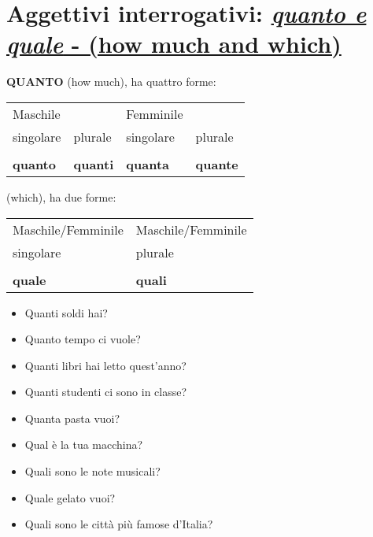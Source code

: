 \documentclass[letter,11pt]{article}
\begin{document}
\vskip 0.5in

\section*{Aggettivi interrogativi:
\underline{\emph{quanto e quale} - (how much and which)}}
\vskip 0.2in

{\bf QUANTO} (how much), ha quattro forme:
\vskip 0.2in

\noindent \begin{tabular}{ |p{3cm}| p{3cm}| p{3cm}| p{3cm}|}
    Maschile  &  &   Femminile &  \\
    singolare & plurale &   singolare & plurale  \\
    \hline
    \hline
     &  &    &  \\ \hline
    {\bf quanto }  & {\bf quanti} &    {\bf quanta} & {\bf quante}   \\ \hline
    \hline
\end{tabular}

\vskip 0.2in

 (which), ha due forme:
\vskip 0.2in

\noindent \begin{tabular}{ |p{5cm}| p{5cm}| }
    Maschile/Femminile  &  Maschile/Femminile   \\
    singolare & plurale   \\
    \hline
    \hline
     &    \\ \hline
    {\bf quale}  & {\bf quali}   \\ \hline
    \hline
\end{tabular}

\vskip 0.5in

\begin{multicols}{2}
\begin{itemize}
    \item Quanti soldi hai?
    \item Quanto tempo ci vuole?
    \item Quanti libri hai letto quest'anno?
    \item Quanti studenti ci sono in classe?
    \item Quanta pasta vuoi?
    \item Qual è la tua macchina?
    \item Quali sono le note musicali?
    \item Quale gelato vuoi?
    \item Quali sono le città più famose d'Italia?


\end{itemize}
\end{multicols}
\end{document}
